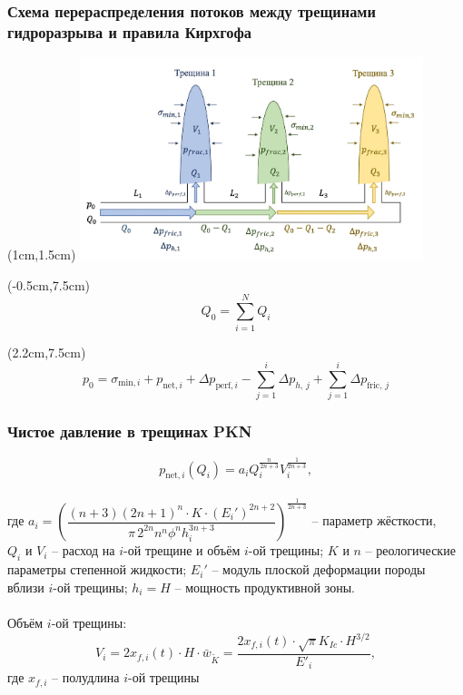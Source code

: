 \documentclass{beamer}
\begin{document}
\begin{frame}
\frametitle{Схема перераспределения потоков между трещинами гидроразрыва и правила Кирхгофа}

\begin{textblock*}{11cm}(1cm,1.5cm)
\includegraphics[width=10cm]{flow_distribution_scheme.jpg}
\end{textblock*}

\begin{textblock*}{4cm}(-0.5cm,7.5cm)
$$\boxed{Q_0=\sum\limits_{i=1}^{N}Q_i}$$
\end{textblock*}

\begin{textblock*}{11cm}(2.2cm,7.5cm)
$$\boxed{p_0=\sigma_{\text{min},i}+p_{\text{net},i}+\Delta p_{\text{perf},i}-\sum_{j=1}^{i}{\Delta p_{h,\,j}}+\sum_{j=1}^{i}\Delta p_{\text{fric},\,j}}$$
\end{textblock*}

\end{frame}


\begin{frame}
\frametitle{Чистое давление в трещинах PKN}
$$
p_{\text{net},i}(Q_i)=a_iQ_i^{\frac{n}{2n+3}}V_i^{\frac{1}{2n+3}},
$$\\
\small
где $a_i=\left(\dfrac{(n+3)(2n+1)^n \cdot K\cdot (E_i')^{2n+2}}{\pi\, 2^{2n}n^n\phi^n h_i^{3n+3}}\right)^{\!\frac{1}{2n+3}}$ -- параметр жёсткости,\newline\\
$Q_i$ и $V_i$ -- расход на $i$-ой трещине и объём $i$-ой трещины;\newline
$K$ и $n$ -- реологические параметры степенной жидкости;\newline
$E_i'$ -- модуль плоской деформации породы вблизи $i$-ой трещины;\newline
$h_i=H$ -- мощность продуктивной зоны.\\\\

Объём $i$-ой трещины:
$$V_i=2x_{\!f,i}(t)\cdot H\cdot \bar{w}_{\!\tilde{K}}=\frac{2x_{\!f,i}(t)\cdot \sqrt{\pi}K_{Ic}\cdot H^{3/2}}{E'_i},$$
где $x_{\!f,i}$ -- полудлина $i$-ой трещины

\normalsize
\end{frame}
\end{document}
